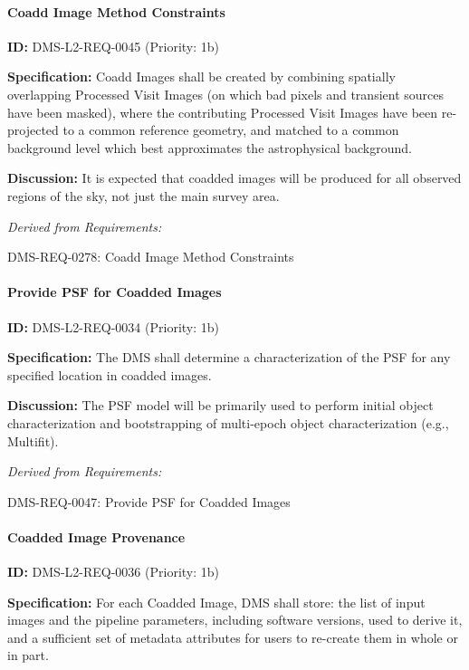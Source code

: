 \documentclass[SE,toc,lsstdraft]{lsstdoc}
\begin{document}
\paragraph{Coadd Image Method Constraints}\hfill  %

\label{DMS-L2-REQ-0045}
\textbf{ID:} DMS-L2-REQ-0045 (Priority: 1b)

\textbf{Specification:} Coadd Images shall be created by combining spatially overlapping Processed Visit Images (on which bad pixels and transient sources have been masked), where the contributing Processed Visit Images have been re-projected to a common reference geometry, and matched to a common background level which best approximates the astrophysical background.

\textbf{Discussion:} It is expected that coadded images will be produced for all observed regions of the sky, not just the main survey area.

\emph{Derived from Requirements:}

DMS-REQ-0278:
Coadd Image Method Constraints \newline

\paragraph{Provide PSF for Coadded Images}\hfill  %

\label{DMS-L2-REQ-0034}
\textbf{ID:} DMS-L2-REQ-0034 (Priority: 1b)

\textbf{Specification:} The DMS shall determine a characterization of the PSF for any specified location in coadded images.

\textbf{Discussion:} The PSF model will be primarily used to perform initial object characterization and bootstrapping of multi-epoch object characterization (e.g., Multifit).

\emph{Derived from Requirements:}

DMS-REQ-0047:
Provide PSF for Coadded Images \newline

\paragraph{Coadded Image Provenance}\hfill  %

\label{DMS-L2-REQ-0036}
\textbf{ID:} DMS-L2-REQ-0036 (Priority: 1b)

\textbf{Specification:} For each Coadded Image, DMS shall store: the list of input images and the pipeline parameters, including software versions, used to derive it, and a sufficient set of metadata attributes for users to re-create them in whole or in part.
\end{document}
